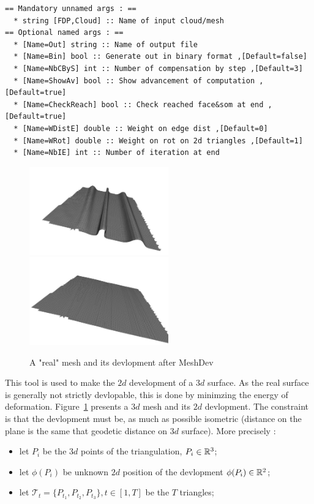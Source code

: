 \begin{verbatim}
== Mandatory unnamed args : ==
  * string [FDP,Cloud] :: Name of input cloud/mesh
== Optional named args : ==
  * [Name=Out] string :: Name of output file
  * [Name=Bin] bool :: Generate out in binary format ,[Default=false]
  * [Name=NbCByS] int :: Number of compensation by step ,[Default=3]
  * [Name=ShowAv] bool :: Show advancement of computation ,[Default=true]
  * [Name=CheckReach] bool :: Check reached face&som at end ,[Default=true]
  * [Name=WDistE] double :: Weight on edge dist ,[Default=0]
  * [Name=WRot] double :: Weight on rot on 2d triangles ,[Default=1]
  * [Name=NbIE] int :: Number of iteration at end
\end{verbatim}

\begin{figure}
\centering
\includegraphics[width=6cm]{CommandReferences/ImagesComRef/Mesh3D.jpg}
\includegraphics[width=6cm]{CommandReferences/ImagesComRef/Mesh2D.jpg}
\caption{A "real" mesh and its devlopment after MeshDev}
\label{fig:RealDev}
\end{figure}


This tool is used to make the $2d$ development of a $3d$ surface. As the real surface
is generally not strictly devlopable, this is done by minimzing the energy of deformation.
Figure~\ref{fig:RealDev} presents a $3d$ mesh and its $2d$ devlopment.
The constraint is that the devlopment must be, as much as possible isometric (distance on
the plane is the same that geodetic distance on $3d$ surface).  More precisely :

\begin{itemize}
      \item let  $P_i$ be the $3d$ points of the triangulation, $P_i \in \mathbb{R}^3$;
      \item let  $\phi(P_i)$ be unknown $2d$  position of the devlopment $\phi(P_i) \in \mathbb{R}^2$;
      \item let  $\mathcal{T}_t = \{P_{t_1},P_{t_2},P_{t_3}\}, t \in [1,T] $ be the $T$ triangles;
\end{itemize}


